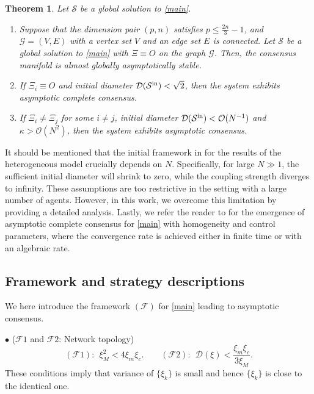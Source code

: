 \documentclass[11pt,reqno]{amsart}
\numberwithin{figure}{section}
\newcommand{\kp}{\kappa}
\newcommand{\init}{  {\textup{in}} }
\newtheorem{theorem}{Theorem}[section]
\begin{document}
\begin{theorem}
Let $\mathcal S$ be a global solution to \eqref{main}. 
\begin{enumerate}
\item \cite{M1,M2}
Suppose that the dimension pair $(p,n)$ satisfies $p\leq \frac{2n}{3}-1$, and $\mathcal G = (V,E)$ with a vertex set $V$ and an edge set $E$ is connected. Let $\mathcal S$ be a global solution to \eqref{main} with $\Xi\equiv O$ on the graph $\mathcal G$. Then, the consensus manifold  is almost globally asymptotically stable. 
\item \cite{HKK22} If $\Xi_i \equiv O$ and initial diameter $\mathcal D(\mathcal S^\init) <\sqrt2$, then the system exhibits  asymptotic complete consensus. 
\item \cite{HKK22} If $\Xi_i \neq \Xi_j$ for some $i\neq j$, initial diameter $\mathcal D(\mathcal S^\init) <\mathcal O(N^{-1})$ and $\kp> \mathcal O(N^2)$, then the system exhibits asymptotic consensus.  
\end{enumerate}
\end{theorem}

It should be mentioned that the initial framework in \cite{HKK22} for the results of the heterogeneous model crucially depends on $N$. Specifically, for large $N\gg1$, the sufficient initial diameter will shrink to zero, while the coupling strength diverges to infinity. These assumptions are too restrictive in the setting with a large number of agents. However, in this work, we overcome this limitation by providing a detailed analysis. Lastly, we refer the reader to \cite{K23} for the emergence of asymptotic complete consensus for \eqref{main} with homogeneity and control parameters, where the convergence rate is achieved either in finite time or with an algebraic rate.



\subsection{Framework and strategy descriptions} \label{sec:2.4}
We here introduce the framework $(\mathcal F)$ for \eqref{main} leading to asymptotic consensus. 

$\bullet$ ($\mathcal F1$ and $\mathcal F2$: Network topology)
\begin{equation}\label{F1}
(\mathcal F1):~~\xi_M^2 <4\xi_m \xi_c. \qquad (\mathcal F2):~~ \mathcal D(\xi) < \frac{\xi_m\xi_c}{3 \xi_M}.
\end{equation}
These conditions imply that variance of  $\{\xi_k\}$ is small and hence $\{\xi_k\}$ is close to the identical one. %
\end{document}
